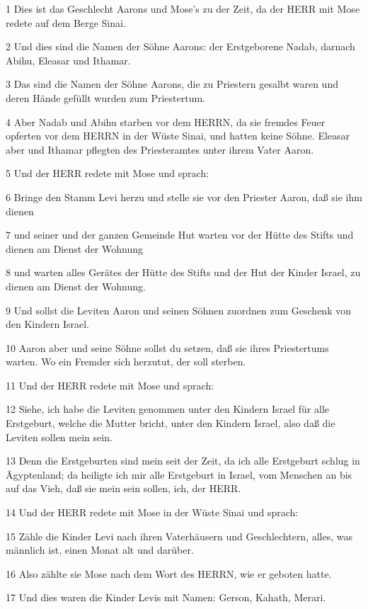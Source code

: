 \par 1 Dies ist das Geschlecht Aarons und Mose's zu der Zeit, da der HERR mit Mose redete auf dem Berge Sinai.
\par 2 Und dies sind die Namen der Söhne Aarons: der Erstgeborene Nadab, darnach Abihu, Eleasar und Ithamar.
\par 3 Das sind die Namen der Söhne Aarons, die zu Priestern gesalbt waren und deren Hände gefüllt wurden zum Priestertum.
\par 4 Aber Nadab und Abihu starben vor dem HERRN, da sie fremdes Feuer opferten vor dem HERRN in der Wüste Sinai, und hatten keine Söhne. Eleasar aber und Ithamar pflegten des Priesteramtes unter ihrem Vater Aaron.
\par 5 Und der HERR redete mit Mose und sprach:
\par 6 Bringe den Stamm Levi herzu und stelle sie vor den Priester Aaron, daß sie ihm dienen
\par 7 und seiner und der ganzen Gemeinde Hut warten vor der Hütte des Stifts und dienen am Dienst der Wohnung
\par 8 und warten alles Gerätes der Hütte des Stifts und der Hut der Kinder Israel, zu dienen am Dienst der Wohnung.
\par 9 Und sollst die Leviten Aaron und seinen Söhnen zuordnen zum Geschenk von den Kindern Israel.
\par 10 Aaron aber und seine Söhne sollst du setzen, daß sie ihres Priestertums warten. Wo ein Fremder sich herzutut, der soll sterben.
\par 11 Und der HERR redete mit Mose und sprach:
\par 12 Siehe, ich habe die Leviten genommen unter den Kindern Israel für alle Erstgeburt, welche die Mutter bricht, unter den Kindern Israel, also daß die Leviten sollen mein sein.
\par 13 Denn die Erstgeburten sind mein seit der Zeit, da ich alle Erstgeburt schlug in Ägyptenland; da heiligte ich mir alle Erstgeburt in Israel, vom Menschen an bis auf das Vieh, daß sie mein sein sollen, ich, der HERR.
\par 14 Und der HERR redete mit Mose in der Wüste Sinai und sprach:
\par 15 Zähle die Kinder Levi nach ihren Vaterhäusern und Geschlechtern, alles, was männlich ist, einen Monat alt und darüber.
\par 16 Also zählte sie Mose nach dem Wort des HERRN, wie er geboten hatte.
\par 17 Und dies waren die Kinder Levis mit Namen: Gerson, Kahath, Merari.
